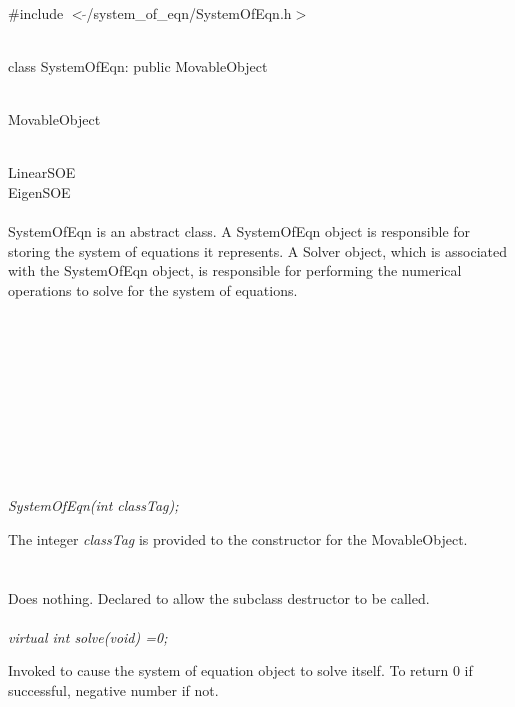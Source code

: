 
   \\
\#include $<\tilde{ }$/system\_of\_eqn/SystemOfEqn.h$>$  


  \\
class SystemOfEqn:  public MovableObject 


 \\
MovableObject 

\indent{} \\
\indent\indent\indent LinearSOE \\
\indent\indent\indent EigenSOE \\

  \\
\indent SystemOfEqn is an abstract class. A SystemOfEqn object
is responsible for storing the system of equations it represents.
A Solver object, which is associated with the SystemOfEqn object, is
responsible for performing the numerical operations to solve for the
system of equations. \\ 

 \\
\indent{}  \\ 
\indent{}  \\ \\
\indent{}  \\ 
\indent{}\\  \\
\indent{}  \\ 
\indent{} \\


  \\
{\em SystemOfEqn(int classTag);}  

The integer {\em classTag} is provided to the constructor for the
MovableObject.  \\

 \\
\\ 
Does nothing. Declared to allow the subclass destructor to be called. \\

  \\
{\em virtual int solve(void) =0;} 

Invoked to cause the system of equation object to solve itself. To
return $0$ if successful, negative number if not.




